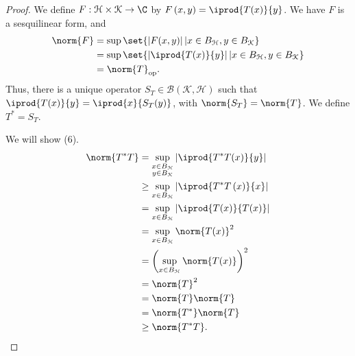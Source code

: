 \documentclass[10pt]{mypackage}
\begin{document}
\begin{proof}
  We define $F: \mathcal{H}\times \mathcal{K}\rightarrow \C$ by $F\left(x,y\right) = \iprod{T(x)}{y}$. We have $F$ is a sesquilinear form, and
  \begin{align*}
    \norm{F} &= \sup\set{\left\vert F(x,y) \right\vert | x\in B_{\mathcal{H}},y\in B_{\mathcal{K}}}\\
             &= \sup\set{\left\vert \iprod{T(x)}{y} \right\vert | x\in B_{\mathcal{H}},y\in B_{\mathcal{K}}}\\
             &= \norm{T}_{\text{op}}.
  \end{align*}
  Thus, there is a unique operator $S_T\in \mathcal{B}\left(\mathcal{K},\mathcal{H}\right)$ such that $ \iprod{T(x)}{y} = \iprod{x}{S_T(y)} $, with $\norm{S_T} = \norm{T}$. We define $T^{\ast} = S_T$.\newline

  We will show (6).
  \begin{align*}
    \norm{T^{\ast}T} &= \sup_{\substack{x\in B_{\mathcal{H}}\\y\in B_{\mathcal{K}}}} \left\vert \iprod{T^{\ast} T (x)}{y} \right\vert\\
                     &\geq \sup_{x\in B_{\mathcal{H}}} \left\vert \iprod{T^{\ast}T\left(x\right)}{x} \right\vert\\
                     &= \sup_{x\in B_{\mathcal{H}}}\left\vert \iprod{T(x)}{T(x)} \right\vert\\
                     &= \sup_{x\in B_{\mathcal{H}}} \norm{T(x)}^2\\
                     &= \left(\sup_{x\in B_{\mathcal{H}}}\norm{T(x)}\right)^2\\
                     &= \norm{T}^2\\
                     &= \norm{T}\norm{T}\\
                     &= \norm{T^{\ast}}\norm{T}\\
                     &\geq \norm{T^{\ast}T}.
  \end{align*}
\end{proof}
\end{document}
